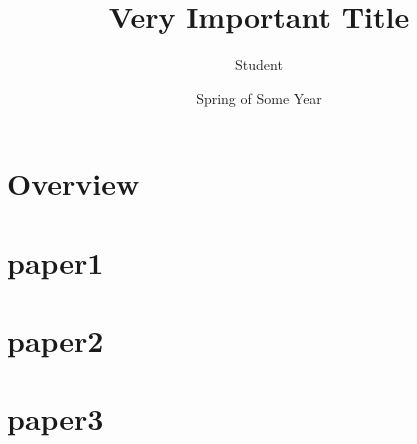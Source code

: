 \documentclass{ucdenver-proposal}
\title{Very Important Title}
\author{Student}
\date{Spring of Some Year}
\begin{document}
\part*{Overview}
\part{paper1}
\part{paper2}
\part{paper3}
\end{document}
